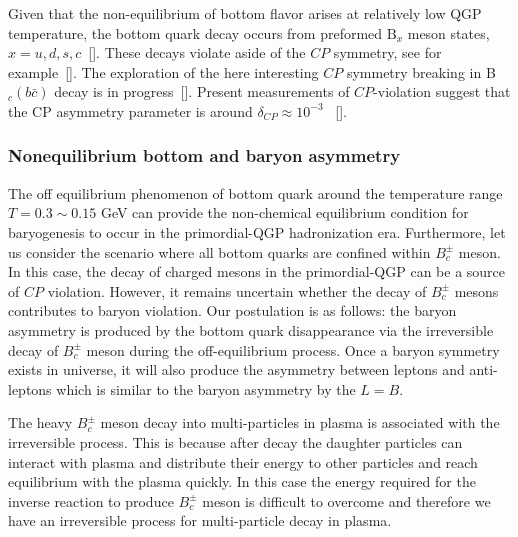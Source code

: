 Given that the non-equilibrium of bottom flavor arises at relatively low QGP temperature, the bottom quark decay occurs from preformed $\mathrm{B}_x$ meson states, $x=u,d,s,c$~[\cite{Karsch:1987pv,Brambilla:2010vq,Aarts:2011sm,Brambilla:2017zei,Bazavov:2018wmo,Offler:2019eij}]. These decays violate aside of the $CP$ symmetry, see for example~[\cite{LHCb:2019jta,LHCb:2020vut}]. The exploration of the here interesting $CP$ symmetry breaking in B$_c(b\bar c)$ decay is in progress~[\cite{Tully:2019ltb,HFLAV:2019otj,ParticleDataGroup:2018ovx}]. 
 Present measurements of $CP$-violation suggest that the CP asymmetry parameter is around $\delta_{CP}\approx10^{-3}$ ~[\cite{ParticleDataGroup:2018ovx}].


\subsubsection{Nonequilibrium bottom and baryon asymmetry}
 The off equilibrium phenomenon of bottom quark around the temperature range $T=0.3\sim0.15$ GeV can provide the non-chemical equilibrium condition for baryogenesis to occur in the primordial-QGP hadronization era. Furthermore, let us consider the scenario where all bottom quarks are confined within $B_c^\pm$ meson. In this case, the decay of charged mesons in the primordial-QGP can be a source of $CP$ violation. However, it remains uncertain whether the decay of $B_c^\pm$ mesons contributes to baryon violation. Our postulation is as follows: the baryon asymmetry is produced by the bottom quark disappearance via the irreversible decay of $B^\pm_c$ meson during the off-equilibrium process. Once a baryon symmetry exists in universe, it will also produce the asymmetry between leptons and anti-leptons which is similar to the baryon asymmetry by the $L=B$.

The heavy $B_c^\pm$ meson decay into multi-particles in plasma is associated with the irreversible process. This is because after decay the daughter particles can interact with plasma and distribute their energy to other particles and reach equilibrium with the plasma quickly. In this case the  energy required for the inverse reaction to produce $B_c^\pm$ meson is difficult to overcome and therefore we have an irreversible process for multi-particle decay in plasma.


